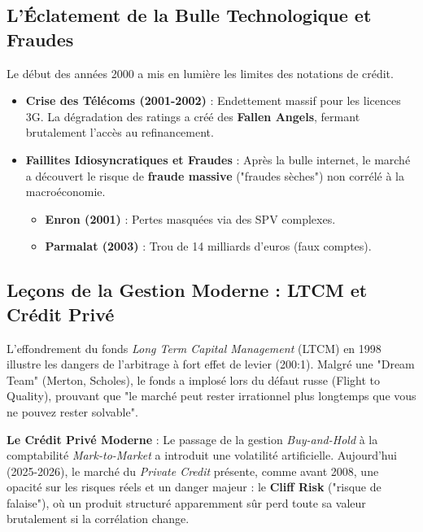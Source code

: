 \subsection{L'Éclatement de la Bulle Technologique et Fraudes}
Le début des années 2000 a mis en lumière les limites des notations de crédit.
\begin{itemize}
    \item \textbf{Crise des Télécoms (2001-2002)} : Endettement massif pour les licences 3G. La dégradation des ratings a créé des \textbf{Fallen Angels}, fermant brutalement l'accès au refinancement.
    \item \textbf{Faillites Idiosyncratiques et Fraudes} : Après la bulle internet, le marché a découvert le risque de \textbf{fraude massive} ("fraudes sèches") non corrélé à la macroéconomie.
    \begin{itemize}
        \item \textbf{Enron (2001)} : Pertes masquées via des SPV complexes.
        \item \textbf{Parmalat (2003)} : Trou de 14 milliards d'euros (faux comptes).
    \end{itemize}
\end{itemize}

\subsection{Leçons de la Gestion Moderne : LTCM et Crédit Privé}

L'effondrement du fonds \textit{Long Term Capital Management} (LTCM) en 1998 illustre les dangers de l'arbitrage à fort effet de levier (200:1). Malgré une "Dream Team" (Merton, Scholes), le fonds a implosé lors du défaut russe (Flight to Quality), prouvant que "le marché peut rester irrationnel plus longtemps que vous ne pouvez rester solvable".

\textbf{Le Crédit Privé Moderne} : Le passage de la gestion \textit{Buy-and-Hold} à la comptabilité \textit{Mark-to-Market} a introduit une volatilité artificielle. Aujourd'hui (2025-2026), le marché du \textit{Private Credit} présente, comme avant 2008, une opacité sur les risques réels et un danger majeur : le \textbf{Cliff Risk} ("risque de falaise"), où un produit structuré apparemment sûr perd toute sa valeur brutalement si la corrélation change.